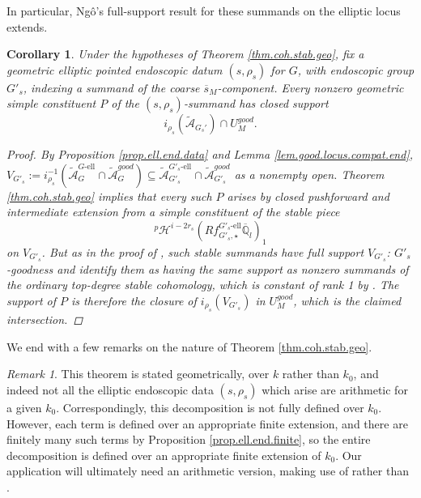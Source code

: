 \documentclass[openany]{amsbook}
\newtheorem{corollary}[theorem]{Corollary}
\theoremstyle{definition}
\theoremstyle{remark}
\newtheorem{remark}[theorem]{Remark}
\numberwithin{equation}{section}
\newcommand{\Q}{\mathbb{Q}}
\newcommand{\cA}{\mathcal{A}}
\newcommand{\ol}[1]{\overline{#1}}
\renewcommand{\-}{\operatorname{-}}
\newcommand{\pHishift}{{}^p \mathcal{H}^{i - 2r_s}}
\newcommand{\good}{\mathit{good}}
\newcommand{\el}{\text{-ell}}
\newcommand{\ctA}{\widetilde{\cA}}
\begin{document}
In particular, Ng\^{o}'s full-support result for these summands on the elliptic locus extends.
\begin{corollary}\label{cor.full.supp}
    Under the hypotheses of Theorem \ref{thm.coh.stab.geo}, fix a geometric elliptic pointed endoscopic datum $(s, \rho_s)$ for $G$, with endoscopic group $G'_s$, indexing a summand of the coarse $\ol{s}_M$-component. Every nonzero geometric simple constituent $P$ of the $(s, \rho_s)$-summand has closed support
    $$
        i_{\rho_s}(\ctA_{G_s'}) \cap U_M^{\good}.
    $$
    \begin{proof}
        By Proposition \ref{prop.ell.end.data} and Lemma \ref{lem.good.locus.compat.end}, $V_{G'_s} := i_{\rho_s}^{-1}(\ctA_{G}^{G\el} \cap \ctA_G^{\good}) \subseteq \ctA_{G'_s}^{G'_s\el} \cap \ctA_{G'_s}^{\good}$
        as a nonempty open. Theorem \ref{thm.coh.stab.geo} implies that every such $P$ arises by closed pushforward and intermediate extension from a simple constituent of the stable piece $$\pHishift(Rf_{G'_{s}, \star}^{G'_{s}\el} \ol{\Q}_l)_1$$
        on $V_{G'_s}$. But as in the proof of \cite[Theorem 7.8.3]{ngofl}, such stable summands have full support $V_{G'_s}$: $G'_s$-goodness and \cite[Proposition 7.2.3]{ngofl} identify them as having the same support as nonzero summands of the ordinary top-degree stable cohomology, which is constant of rank 1 by \cite[Proposition 6.5.1]{ngofl}. The support of $P$ is therefore the closure of $i_{\rho_s}(V_{G'_s})$ in $U_M^{\good}$, which is the claimed intersection.
    \end{proof}
\end{corollary}

We end with a few remarks on the nature of Theorem \ref{thm.coh.stab.geo}.
\begin{remark}
    This theorem is stated geometrically, over $k$ rather than $k_0$, and indeed not all the elliptic endoscopic data $(s, \rho_{s})$ which arise are arithmetic for a given $k_0$. Correspondingly, this decomposition is not fully defined over $k_0$. However, each term is defined over an appropriate finite extension, and there are finitely many such terms by Proposition \ref{prop.ell.end.finite}, so the entire decomposition is defined over an appropriate finite extension of $k_0$. Our application will ultimately need an arithmetic version, making use of \cite[6.4.2]{ngofl} rather than \cite[6.4.1]{ngofl}.
\end{remark}
\end{document}
